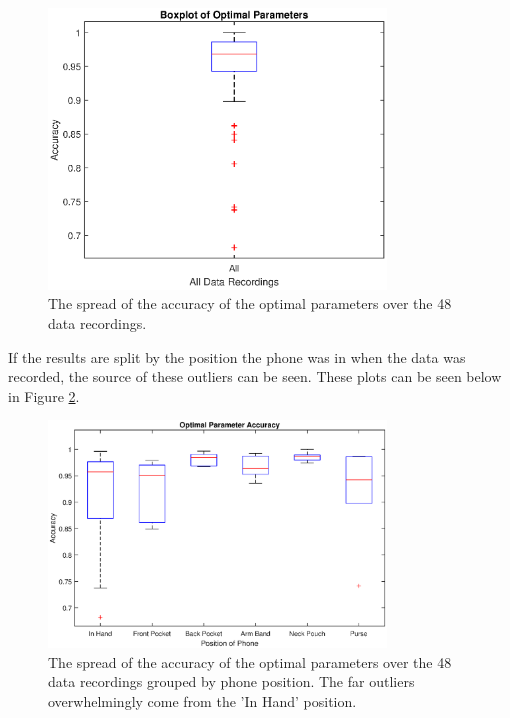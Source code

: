             \begin{figure}[!th]
                \includegraphics[width=0.8\textwidth]{Images/opt_params_overall.eps}
                \centering
                \caption{The spread of the accuracy of the optimal parameters over the 48 data recordings.}
                \label{img_opt_params_overall}
            \end{figure}

            If the results are split by the position the phone was in when the data was recorded, the source of these outliers can be seen. These plots can be seen below in Figure \ref{img_opt_params_positions_bp}.

            \begin{figure}[!th]
                \includegraphics[width=0.8\textwidth]{Images/opt_params_positions_bp.eps}
                \centering
                \caption{The spread of the accuracy of the optimal parameters over the 48 data recordings grouped by phone position. The far outliers overwhelmingly come from the 'In Hand' position.}
                \label{img_opt_params_positions_bp}
            \end{figure}

